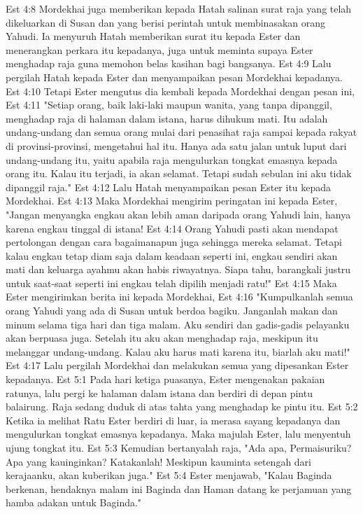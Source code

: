 Est 4:8  Mordekhai juga memberikan kepada Hatah salinan surat raja yang telah dikeluarkan di Susan dan yang berisi perintah untuk membinasakan orang Yahudi. Ia menyuruh Hatah memberikan surat itu kepada Ester dan menerangkan perkara itu kepadanya, juga untuk meminta supaya Ester menghadap raja guna memohon belas kasihan bagi bangsanya.
Est 4:9  Lalu pergilah Hatah kepada Ester dan menyampaikan pesan Mordekhai kepadanya.
Est 4:10  Tetapi Ester mengutus dia kembali kepada Mordekhai dengan pesan ini,
Est 4:11  "Setiap orang, baik laki-laki maupun wanita, yang tanpa dipanggil, menghadap raja di halaman dalam istana, harus dihukum mati. Itu adalah undang-undang dan semua orang mulai dari penasihat raja sampai kepada rakyat di provinsi-provinsi, mengetahui hal itu. Hanya ada satu jalan untuk luput dari undang-undang itu, yaitu apabila raja mengulurkan tongkat emasnya kepada orang itu. Kalau itu terjadi, ia akan selamat. Tetapi sudah sebulan ini aku tidak dipanggil raja."
Est 4:12  Lalu Hatah menyampaikan pesan Ester itu kepada Mordekhai.
Est 4:13  Maka Mordekhai mengirim peringatan ini kepada Ester, "Jangan menyangka engkau akan lebih aman daripada orang Yahudi lain, hanya karena engkau tinggal di istana!
Est 4:14  Orang Yahudi pasti akan mendapat pertolongan dengan cara bagaimanapun juga sehingga mereka selamat. Tetapi kalau engkau tetap diam saja dalam keadaan seperti ini, engkau sendiri akan mati dan keluarga ayahmu akan habis riwayatnya. Siapa tahu, barangkali justru untuk saat-saat seperti ini engkau telah dipilih menjadi ratu!"
Est 4:15  Maka Ester mengirimkan berita ini kepada Mordekhai,
Est 4:16  "Kumpulkanlah semua orang Yahudi yang ada di Susan untuk berdoa bagiku. Janganlah makan dan minum selama tiga hari dan tiga malam. Aku sendiri dan gadis-gadis pelayanku akan berpuasa juga. Setelah itu aku akan menghadap raja, meskipun itu melanggar undang-undang. Kalau aku harus mati karena itu, biarlah aku mati!"
Est 4:17  Lalu pergilah Mordekhai dan melakukan semua yang dipesankan Ester kepadanya.
Est 5:1  Pada hari ketiga puasanya, Ester mengenakan pakaian ratunya, lalu pergi ke halaman dalam istana dan berdiri di depan pintu balairung. Raja sedang duduk di atas tahta yang menghadap ke pintu itu.
Est 5:2  Ketika ia melihat Ratu Ester berdiri di luar, ia merasa sayang kepadanya dan mengulurkan tongkat emasnya kepadanya. Maka majulah Ester, lalu menyentuh ujung tongkat itu.
Est 5:3  Kemudian bertanyalah raja, "Ada apa, Permaisuriku? Apa yang kauinginkan? Katakanlah! Meskipun kauminta setengah dari kerajaanku, akan kuberikan juga."
Est 5:4  Ester menjawab, "Kalau Baginda berkenan, hendaknya malam ini Baginda dan Haman datang ke perjamuan yang hamba adakan untuk Baginda."
